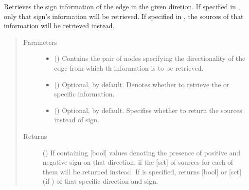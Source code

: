 \documentclass[letterpaper,10pt,english]{sphinxmanual}
\begin{document}
\begin{fulllineitems}

\begin{fulllineitems}
\label{\detokenize{main:pypath.main.Direction.get_sign}}
Retrieves the sign information of the edge in the given
diretion. If specified in , only that sign’s information
will be retrieved. If specified in , the sources of
that information will be retrieved instead.
\begin{quote}\begin{description}
\item[{Parameters}] \leavevmode\begin{itemize}
\item {} 
 () \textendash{} Contains the pair of nodes specifying the directionality of
the edge from which th information is to be retrieved.

\item {} 
 () \textendash{} Optional,  by default. Denotes whether to retrieve
the  or  specific information.

\item {} 
 () \textendash{} Optional,  by default. Specifies whether to return
the sources instead of sign.

\end{itemize}

\item[{Returns}] \leavevmode
() \textendash{} If  containing {[}bool{]} values
denoting the presence of positive and negative sign on that
direction, if  the {[}set{]} of sources for each
of them will be returned instead. If  is specified,
returns {[}bool{]} or {[}set{]} (if ) of that
specific direction and sign.

\end{description}\end{quote}


\end{fulllineitems}
\end{fulllineitems}
\end{document}
